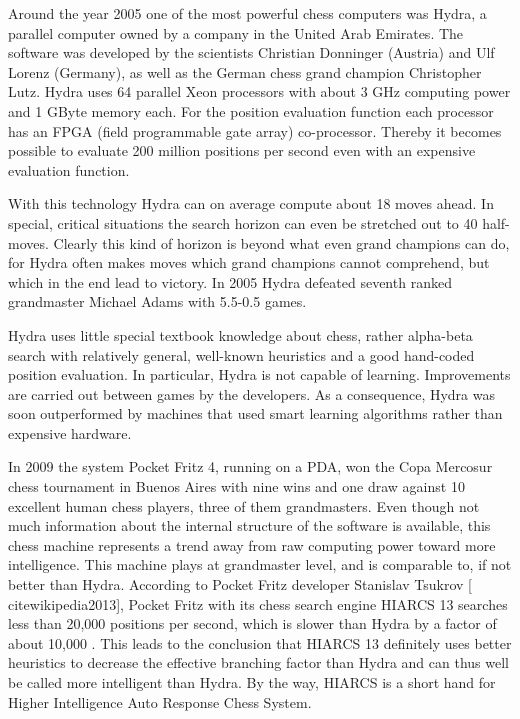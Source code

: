 \documentclass[10pt]{book}
\begin{document}
Around the year 2005 one of the most powerful chess computers was Hydra, a parallel computer owned by a company in the United Arab Emirates. The software was developed by the scientists Christian Donninger (Austria) and Ulf Lorenz (Germany), as well as the German chess grand champion Christopher Lutz. Hydra uses 64 parallel Xeon processors with about 3 GHz computing power and 1 GByte memory each. For the position evaluation function each processor has an FPGA (field programmable gate array) co-processor. Thereby it becomes possible to evaluate 200 million positions per second even with an expensive evaluation function.

With this technology Hydra can on average compute about 18 moves ahead. In special, critical situations the search horizon can even be stretched out to 40 half-moves. Clearly this kind of horizon is beyond what even grand champions can do, for Hydra often makes moves which grand champions cannot comprehend, but which in the end lead to victory. In 2005 Hydra defeated seventh ranked grandmaster Michael Adams with 5.5-0.5 games.

Hydra uses little special textbook knowledge about chess, rather alpha-beta search with relatively general, well-known heuristics and a good hand-coded\\
position evaluation. In particular, Hydra is not capable of learning. Improvements are carried out between games by the developers. As a consequence, Hydra was soon outperformed by machines that used smart learning algorithms rather than expensive hardware.


In 2009 the system Pocket Fritz 4, running on a PDA, won the Copa Mercosur chess tournament in Buenos Aires with nine wins and one draw against 10 excellent human chess players, three of them grandmasters. Even though not much information about the internal structure of the software is available, this chess machine represents a trend away from raw computing power toward more intelligence. This machine plays at grandmaster level, and is comparable to, if not better than Hydra. According to Pocket Fritz developer Stanislav Tsukrov [\\cite{wikipedia2013}], Pocket Fritz with its chess search engine HIARCS 13 searches less than 20,000 positions per second, which is slower than Hydra by a factor of about 10,000 . This leads to the conclusion that HIARCS 13 definitely uses better heuristics to decrease the effective branching factor than Hydra and can thus well be called more intelligent than Hydra. By the way, HIARCS is a short hand for Higher Intelligence Auto Response Chess System.
\end{document}
